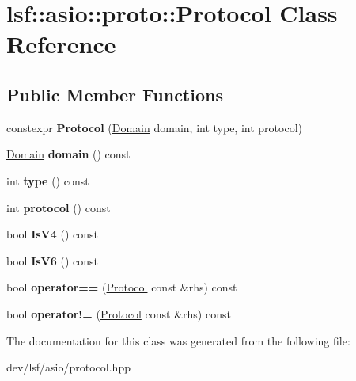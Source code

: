 \hypertarget{classlsf_1_1asio_1_1proto_1_1Protocol}{
\section{lsf::asio::proto::Protocol Class Reference}
\label{classlsf_1_1asio_1_1proto_1_1Protocol}
}
\subsection*{Public Member Functions}
\begin{DoxyCompactItemize}
\item 
\hypertarget{classlsf_1_1asio_1_1proto_1_1Protocol_ae2237cc9961ce2c629fef40ce5c3901c}{
constexpr {\bfseries Protocol} (\hyperlink{classlsf_1_1asio_1_1proto_1_1Domain}{Domain} domain, int type, int protocol)}
\label{classlsf_1_1asio_1_1proto_1_1Protocol_ae2237cc9961ce2c629fef40ce5c3901c}

\item 
\hypertarget{classlsf_1_1asio_1_1proto_1_1Protocol_ad297fb92f46bd6bb273bca116c095b7e}{
\hyperlink{classlsf_1_1asio_1_1proto_1_1Domain}{Domain} {\bfseries domain} () const }
\label{classlsf_1_1asio_1_1proto_1_1Protocol_ad297fb92f46bd6bb273bca116c095b7e}

\item 
\hypertarget{classlsf_1_1asio_1_1proto_1_1Protocol_abdd854111eb30386335844b5cb683e07}{
int {\bfseries type} () const }
\label{classlsf_1_1asio_1_1proto_1_1Protocol_abdd854111eb30386335844b5cb683e07}

\item 
\hypertarget{classlsf_1_1asio_1_1proto_1_1Protocol_a9a246f1be5cd32c831ffe71cd306fe19}{
int {\bfseries protocol} () const }
\label{classlsf_1_1asio_1_1proto_1_1Protocol_a9a246f1be5cd32c831ffe71cd306fe19}

\item 
\hypertarget{classlsf_1_1asio_1_1proto_1_1Protocol_a352e73cf5d36948a20be7481095f14f3}{
bool {\bfseries IsV4} () const }
\label{classlsf_1_1asio_1_1proto_1_1Protocol_a352e73cf5d36948a20be7481095f14f3}

\item 
\hypertarget{classlsf_1_1asio_1_1proto_1_1Protocol_a13f1e546d1b98d99c99a19f7252b0b90}{
bool {\bfseries IsV6} () const }
\label{classlsf_1_1asio_1_1proto_1_1Protocol_a13f1e546d1b98d99c99a19f7252b0b90}

\item 
\hypertarget{classlsf_1_1asio_1_1proto_1_1Protocol_a32d854e31af1f94911760b6a43595f50}{
bool {\bfseries operator==} (\hyperlink{classlsf_1_1asio_1_1proto_1_1Protocol}{Protocol} const \&rhs) const }
\label{classlsf_1_1asio_1_1proto_1_1Protocol_a32d854e31af1f94911760b6a43595f50}

\item 
\hypertarget{classlsf_1_1asio_1_1proto_1_1Protocol_a8f888763e6c010d8fec31f3e4e736a69}{
bool {\bfseries operator!=} (\hyperlink{classlsf_1_1asio_1_1proto_1_1Protocol}{Protocol} const \&rhs) const }
\label{classlsf_1_1asio_1_1proto_1_1Protocol_a8f888763e6c010d8fec31f3e4e736a69}

\end{DoxyCompactItemize}


The documentation for this class was generated from the following file:\begin{DoxyCompactItemize}
\item 
dev/lsf/asio/protocol.hpp\end{DoxyCompactItemize}
